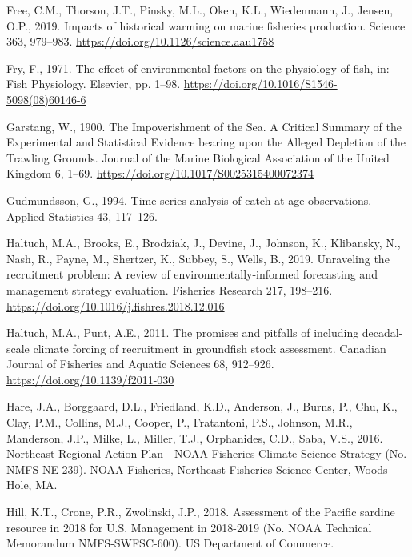 \documentclass[]{article}
\begin{document}
\leavevmode\hypertarget{ref-free2019Impacts}{}%
Free, C.M., Thorson, J.T., Pinsky, M.L., Oken, K.L., Wiedenmann, J.,
Jensen, O.P., 2019. Impacts of historical warming on marine fisheries
production. Science 363, 979--983.
\url{https://doi.org/10.1126/science.aau1758}

\leavevmode\hypertarget{ref-fry1971Effect}{}%
Fry, F., 1971. The effect of environmental factors on the physiology of
fish, in: Fish Physiology. Elsevier, pp. 1--98.
\url{https://doi.org/10.1016/S1546-5098(08)60146-6}

\leavevmode\hypertarget{ref-garstang1900Impoverishment}{}%
Garstang, W., 1900. The Impoverishment of the Sea. A Critical Summary of
the Experimental and Statistical Evidence bearing upon the Alleged
Depletion of the Trawling Grounds. Journal of the Marine Biological
Association of the United Kingdom 6, 1--69.
\url{https://doi.org/10.1017/S0025315400072374}

\leavevmode\hypertarget{ref-gudmundsson1994Time}{}%
Gudmundsson, G., 1994. Time series analysis of catch-at-age
observations. Applied Statistics 43, 117--126.

\leavevmode\hypertarget{ref-haltuch2019Unraveling}{}%
Haltuch, M.A., Brooks, E., Brodziak, J., Devine, J., Johnson, K.,
Klibansky, N., Nash, R., Payne, M., Shertzer, K., Subbey, S., Wells, B.,
2019. Unraveling the recruitment problem: A review of
environmentally-informed forecasting and management strategy evaluation.
Fisheries Research 217, 198--216.
\url{https://doi.org/10.1016/j.fishres.2018.12.016}

\leavevmode\hypertarget{ref-haltuch2011Promises}{}%
Haltuch, M.A., Punt, A.E., 2011. The promises and pitfalls of including
decadal-scale climate forcing of recruitment in groundfish stock
assessment. Canadian Journal of Fisheries and Aquatic Sciences 68,
912--926. \url{https://doi.org/10.1139/f2011-030}

\leavevmode\hypertarget{ref-hare2016Northeast}{}%
Hare, J.A., Borggaard, D.L., Friedland, K.D., Anderson, J., Burns, P.,
Chu, K., Clay, P.M., Collins, M.J., Cooper, P., Fratantoni, P.S.,
Johnson, M.R., Manderson, J.P., Milke, L., Miller, T.J., Orphanides,
C.D., Saba, V.S., 2016. Northeast Regional Action Plan - NOAA Fisheries
Climate Science Strategy (No. NMFS-NE-239). NOAA Fisheries, Northeast
Fisheries Science Center, Woods Hole, MA.

\leavevmode\hypertarget{ref-hill2018Assessment}{}%
Hill, K.T., Crone, P.R., Zwolinski, J.P., 2018. Assessment of the
Pacific sardine resource in 2018 for U.S. Management in 2018-2019 (No.
NOAA Technical Memorandum NMFS-SWFSC-600). US Department of Commerce.
\end{document}
